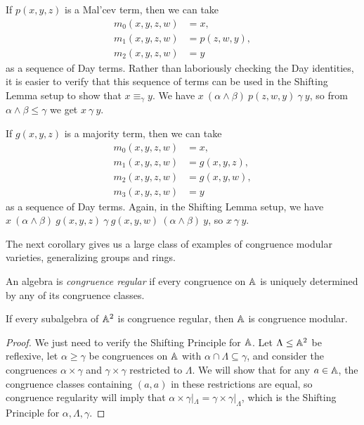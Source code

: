 \begin{appendices}
\begin{comment}
If $\cV$ is idempotent, then we also have $\alpha \circ \beta = 1$, and $\cF_{\cV}(x,y,z,w)/\alpha \wedge \beta \cong \cF_{\cV}(x,y,z,w)/\alpha \times \cF_{\cV}(x,y,z,w)/\beta \cong \cF_{\cV}(x,y)^2$. Then $\theta$ is the congruence corresponding to $\gamma/\alpha \wedge \beta$ under this isomorphism, so we get the displayed equations involving $\theta$.
\end{proof}
\end{comment}

\begin{ex} If $p(x,y,z)$ is a Mal'cev term, then we can take
\begin{align*}
m_0(x,y,z,w) &= x,\\
m_1(x,y,z,w) &= p(z,w,y),\\
m_2(x,y,z,w) &= y
\end{align*}
as a sequence of Day terms. Rather than laboriously checking the Day identities, it is easier to verify that this sequence of terms can be used in the Shifting Lemma setup to show that $x \equiv_\gamma y$. We have $x\ (\alpha \wedge \beta)\ p(z,w,y)\ \gamma\ y$, so from $\alpha \wedge \beta \le \gamma$ we get $x\ \gamma\ y$.
\end{ex}

\begin{ex} If $g(x,y,z)$ is a majority term, then we can take
\begin{align*}
m_0(x,y,z,w) &= x,\\
m_1(x,y,z,w) &= g(x,y,z),\\
m_2(x,y,z,w) &= g(x,y,w),\\
m_3(x,y,z,w) &= y
\end{align*}
as a sequence of Day terms. Again, in the Shifting Lemma setup, we have $x\ (\alpha\wedge\beta)\ g(x,y,z)\ \gamma\ g(x,y,w)\ (\alpha\wedge\beta)\ y$, so $x\ \gamma\ y$.
\end{ex}

The next corollary gives us a large class of examples of congruence modular varieties, generalizing groups and rings.

\begin{defn} An algebra is \emph{congruence regular} if every congruence on $\mathbb{A}$ is uniquely determined by any of its congruence classes.
\end{defn}

\begin{cor} If every subalgebra of $\mathbb{A}^2$ is congruence regular, then $\mathbb{A}$ is congruence modular.
\end{cor}
\begin{proof} We just need to verify the Shifting Principle for $\mathbb{A}$. Let $\Lambda \le \mathbb{A}^2$ be reflexive, let $\alpha \ge \gamma$ be congruences on $\mathbb{A}$ with $\alpha \cap \Lambda \subseteq \gamma$, and consider the congruences $\alpha \times \gamma$ and $\gamma \times \gamma$ restricted to $\Lambda$. We will show that for any $a \in \mathbb{A}$, the congruence classes containing $(a,a)$ in these restrictions are equal, so congruence regularity will imply that $\alpha\times\gamma|_\Lambda = \gamma\times\gamma|_\Lambda$, which is the Shifting Principle for $\alpha,\Lambda,\gamma$.


\end{proof}
\end{appendices}
